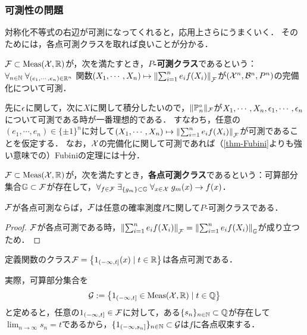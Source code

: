 \documentclass[uplatex,dvipdfmx]{jsreport}
\begin{document}
\subsubsection{可測性の問題}

\begin{tcolorbox}[colframe=ForestGreen, colback=ForestGreen!10!white,breakable,colbacktitle=ForestGreen!40!white,coltitle=black,fonttitle=\bfseries\sffamily,
title=]
    対称化不等式の右辺が可測になってくれると，応用上さらにうまくいく．
    そのためには，各点可測クラスを取れば良いことが分かる．
\end{tcolorbox}

\begin{definition}\label{def-measurable-class}
    $\mathcal{F}\subset\mathrm{Meas}(\mathcal{X},\mathbb{R})$が，次を満たすとき，\textbf{$P$-可測クラス}であるという：
    $\forall_{n\in\mathbb{N}}\;\forall_{(e_1,\cdots,e_n)\in\mathbb{R}^n}\;$関数$(X_1,\cdots,X_n)\mapsto\left\|\sum^n_{i=1}e_if(X_i)\right\|_{\mathcal{F}}$が$(\mathcal{X}^n,\mathcal{B}^n,P^n)$の完備化について可測．
\end{definition}
\begin{remarks}
    先に$\epsilon$に関して，次に$X$に関して積分したいので，$\|\mathbb{P}^\circ_n\|_{\mathcal{F}}$が$X_1,\cdots,X_n,\epsilon_1,\cdots,\epsilon_n$について可測である時が一番理想的である．
    すなわち，任意の$(e_1,\cdots,e_n)\in\{\pm 1\}^n$に対して$(X_1,\cdots,X_n)\mapsto\left\|\sum^n_{i=1}e_if(X_i)\right\|_{\mathcal{F}}$が可測であることを仮定する．
    なお，$\mathcal{X}$の完備化に関して可測であれば（\ref{thm-Fubini}よりも強い意味での）Fubiniの定理には十分．
\end{remarks}

\begin{definition}
    $\mathcal{F}\subset\mathrm{Meas}(\mathcal{X},\mathbb{R})$が，次を満たすとき，\textbf{各点可測クラス}であるという：可算部分集合$\mathbb{G}\subset\mathcal{F}$が存在して，$\forall_{f\in\mathcal{F}}\;\exists_{\{g_m\}\subset\mathbb{G}}\;\forall_{x\in\mathcal{X}}\;g_m(x)\to f(x)$．
\end{definition}

\begin{lemma}
    $\mathcal{F}$が各点可測ならば，$\mathcal{F}$は任意の確率測度$P$に関して$P$-可測クラスである．
\end{lemma}
\begin{proof}
    $\mathcal{F}$が各点可測である時，$\left\|\sum^n_{i=1}e_if(X_i)\right\|_{\mathcal{F}}=\left\|\sum^n_{i=1}e_if(X_i)\right\|_{\mathbb{G}}$が成り立つため．
\end{proof}

\begin{example}\label{exp-pointwise-measurable}
    定義関数のクラス$\mathcal{F}=\left\{1_{(-\infty,t]}(x)\mid t\in\mathbb{R}\right\}$は各点可測である．

    実際，可算部分集合を
    \[\mathcal{G}:=\left\{1_{(-\infty,t]}\in\mathrm{Meas}(\mathcal{X},\mathbb{R})\mid t\in\mathbb{Q}\right\}\]
    と定めると，任意の$1_{(-\infty,t]}\in\mathcal{F}$に対して，ある$\{s_n\}_{n\in\mathbb{N}}\subset\mathbb{Q}$が存在して$\lim_{n\to\infty}s_n=t$であるから，$\{1_{(-\infty,s_n]}\}_{n\in\mathbb{N}}\subset\mathcal{G}$は$f$に各点収束する．
\end{example}
\end{document}
